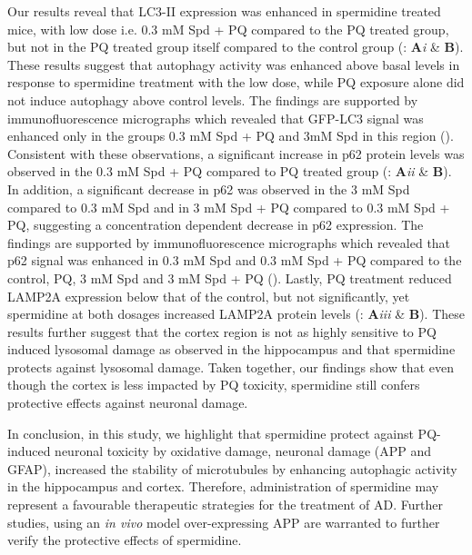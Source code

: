 Our results reveal that LC3-II expression was enhanced in spermidine treated mice, with low dose i.e. 0.3 mM Spd + PQ compared to the PQ treated group, but not in the PQ treated group itself compared to the control group (: \textbf{A}\textit{i} \& \textbf{B}). These results suggest that autophagy activity was enhanced above basal levels in response to spermidine treatment with the low dose, while PQ exposure alone did not induce autophagy above control levels. The findings are supported by immunofluorescence micrographs which revealed that GFP-LC3 signal was enhanced only in the groups 0.3 mM Spd + PQ and 3mM Spd in this region (). Consistent with these observations, a significant increase in p62 protein levels was observed in the 0.3 mM Spd + PQ compared to PQ treated group (: \textbf{A}\textit{ii} \& \textbf{B}). In addition, a significant decrease in p62 was observed in the 3 mM Spd compared to 0.3 mM Spd  and in 3 mM Spd + PQ compared to 0.3 mM Spd + PQ, suggesting a concentration dependent decrease in p62 expression. The findings are supported by immunofluorescence micrographs which revealed that p62 signal was enhanced in 0.3 mM Spd and 0.3 mM Spd + PQ compared to the control, PQ, 3 mM Spd and 3 mM Spd + PQ (). Lastly, PQ treatment reduced LAMP2A expression below that of the control, but not significantly, yet spermidine at both dosages increased LAMP2A protein levels (: \textbf{A}\textit{iii} \& \textbf{B}). These results further suggest that the cortex region is not as highly sensitive to PQ induced lysosomal damage as observed in the hippocampus and that spermidine protects against lysosomal damage. Taken together, our findings show that even though the cortex is less impacted by PQ toxicity, spermidine still confers protective effects against neuronal damage.  

In conclusion, in this study, we highlight that spermidine protect against PQ-induced neuronal toxicity by oxidative damage, neuronal damage (APP and GFAP), increased the stability of microtubules by enhancing autophagic activity in the hippocampus and cortex. Therefore, administration of spermidine may represent a favourable therapeutic strategies for the treatment of AD. Further studies, using an \textit{in vivo} model over-expressing APP are warranted to further verify the protective effects of spermidine.